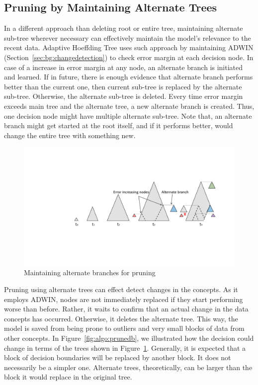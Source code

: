 \subsection{Pruning by Maintaining Alternate Trees}
In a different approach than deleting root or entire tree, maintaining alternate sub-tree wherever necessary can effectively maintain the model's relevance to the recent data. Adaptive Hoeffding Tree uses such approach by maintaining ADWIN (Section~\ref{sec:bg:changedetection}) to check error margin at each decision node. In case of a increase in error margin at any node, an alternate branch is initiated and learned. If in future, there is enough evidence that alternate branch performs better than the current one, then current sub-tree is replaced by the alternate sub-tree. Otherwise, the alternate sub-tree is deleted. Every time error margin exceeds main tree and the alternate tree, a new alternate branch is created. Thus, one decision node might have multiple alternate sub-tree. Note that, an alternate branch might get started at the root itself, and if it performs better, would change the entire tree with something new.

\begin{figure}[htbp]
    \begin{center}
        \includegraphics[width=14.0cm]{figs/prune.pdf}
        \caption{Maintaining alternate branches for pruning}
        \label{fig:algo:prune}
    \end{center}
\end{figure}

Pruning using alternate trees can effect detect changes in the concepts. As it employs ADWIN, nodes are not immediately replaced if they start performing worse than before. Rather, it waits to confirm that an actual change in the data concepts has occurred. Otherwise, it deletes the alternate tree. This way, the model is saved from being prone to outliers and very small blocks of data from other concepts. In Figure~\ref{fig:algo:prunedb}, we illustrated how the decision could change in terms of the trees shown in Figure~\ref{fig:algo:prune}. Generally, it is expected that a block of decision boundaries will be replaced by another block. It does not necessarily be a simpler one. Alternate trees, theoretically, can be larger than the block it would replace in the original tree.

